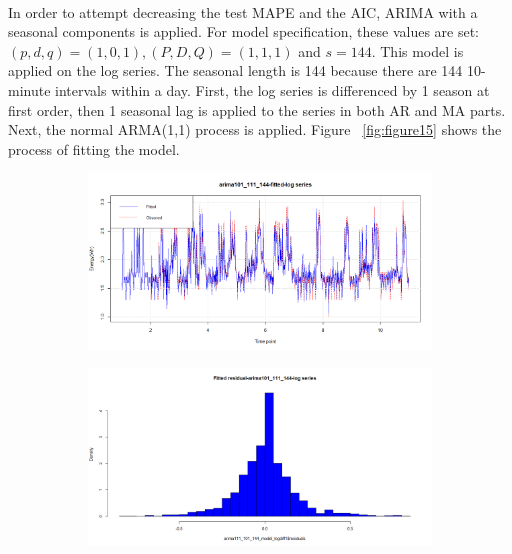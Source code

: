 \documentclass[12pt]{article}
\begin{document}
\paragraph{}
In order to attempt decreasing the test MAPE and the AIC, ARIMA with a seasonal components is applied. For model specification, these values are set: $(p,d,q)=(1,0,1), (P,D,Q)=(1,1,1)$ and $s=144$. This model is applied on the log series. The seasonal length is 144 because there are 144 10-minute intervals within a day. First, the log series is differenced by 1 season at first order, then 1 seasonal lag is applied to the series in both AR and MA parts. Next, the normal ARMA(1,1) process is applied. Figure ~\ref{fig:figure15} shows the process of fitting the model.
\begin{figure}[H]
  \centering
  \begin{subfigure}[b]{0.6\linewidth}
    \includegraphics[width=\linewidth]{figure15-1.png}
  \end{subfigure}
  \begin{subfigure}[b]{0.6\linewidth}
    \includegraphics[width=\linewidth]{figure15-2.png}
  \end{subfigure}
  \begin{subfigure}[b]{0.6\linewidth}

\end{subfigure}
\end{figure}
\end{document}
